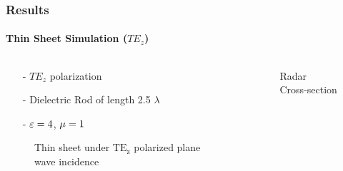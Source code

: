 \documentclass[mathserif,18pt,xcolor=table]{beamer}
\begin{document}
        \begin{frame}
          \frametitle{Results}
          \framesubtitle{Thin Sheet Simulation ($TE_z$)}
          \begin{columns}[T] %
            \begin{column}{.5\textwidth}
              \begin{itemize}
                \item[-]{$TE_z$ polarization}
                \item[-]{Dielectric Rod of length 2.5 $\lambda$}
                \item[-]{$\varepsilon = 4$, $\mu = 1$}
              \end{itemize}
              \begin{figure}[h]
                \normalsize
                \centering
                
                \caption{Thin sheet under $\mathrm{TE_z}$ polarized plane wave incidence}
                \label{fig:te_plate}
              \end{figure}
            \end{column}
            \begin{column}[T]{.5\textwidth}
              \begin{figure}
                \vspace*{-2cm}
                
                \caption{Radar Cross-section}
                \label{fig:TE_rcs}
              \end{figure}
              \end{column}%
            \end{columns}
          \end{frame}
\end{document}
